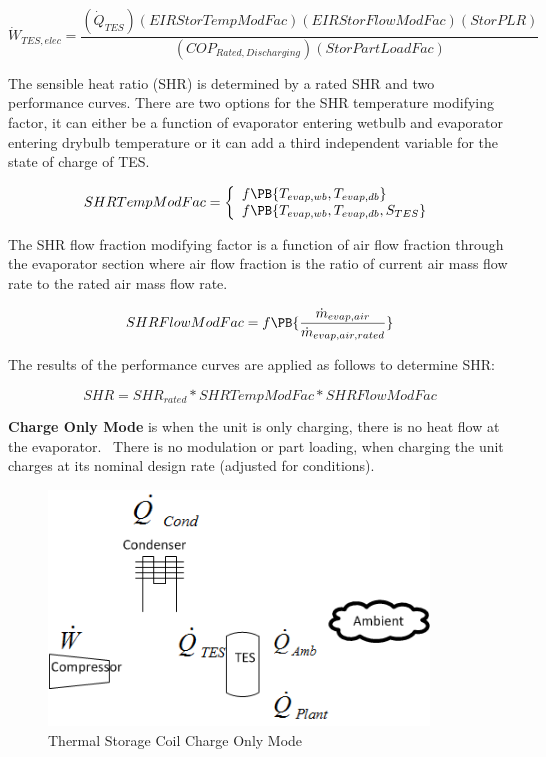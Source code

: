 \begin{equation}
{\dot W_{TES,elec}} = \frac{{\left( {{{\dot Q}_{TES}}} \right)\left( {EIRStorTempModFac} \right)\left( {EIRStorFlowModFac} \right)\left( {StorPLR} \right)}}{{\left( {CO{P_{Rated,Discharging}}} \right)\left( {StorPartLoadFac} \right)}}
\end{equation}

The sensible heat ratio (SHR) is determined by a rated SHR and two performance curves. There are two options for the SHR temperature modifying factor, it can either be a function of evaporator entering wetbulb and evaporator entering drybulb temperature or it can add a third independent variable for the state of charge of TES.

\begin{equation}
  SHRTempModFac = \left\{
    \begin{array}{l}
      f\PB{T_{evap,wb},T_{evap,db}} \\
      f\PB{T_{evap,wb},T_{evap,db},S_{TES}}
    \end{array}
  \right.
\end{equation}

The SHR flow fraction modifying factor is a function of air flow fraction through the evaporator section where air flow fraction is the ratio of current air mass flow rate to the rated air mass flow rate.

\begin{equation}
SHRFlowModFac = f\PB{\frac{\dot{m}_{evap,air}}{\dot{m}_{evap,air,rated}}}
\end{equation}

The results of the performance curves are applied as follows to determine SHR:

\begin{equation}
SHR = SH{R_{rated}}*SHRTempModFac*SHRFlowModFac
\end{equation}

\textbf{Charge Only Mode} is when the unit is only charging, there is no heat flow at the evaporator. ~There is no modulation or part loading, when charging the unit charges at its nominal design rate (adjusted for conditions).

\begin{figure}[hbtp] %
\centering
\includegraphics[width=0.9\textwidth, height=0.9\textheight, keepaspectratio=true]{media/image4355.png}
\caption{Thermal Storage Coil Charge Only Mode \protect \label{fig:thermal-storage-coil-charge-only-mode}}
\end{figure}

